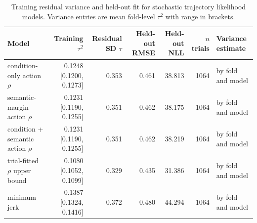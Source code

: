 \begin{table}[htbp]
\centering
\small
\caption{Training residual variance and held-out fit for stochastic trajectory likelihood models. Variance entries are mean fold-level $\tau^2$ with range in brackets.}
\label{tab:stochastic-variance-calibration}
\begin{tabular}{lrrrrrl}
\toprule
Model & Training $\tau^2$ & Residual SD $\tau$ & Held-out RMSE & Held-out NLL & $n$ trials & Variance estimate \\
\midrule
condition-only action $\rho$ & 0.1248 [0.1200, 0.1273] & 0.353 & 0.461 & 38.813 & 1064 & by fold and model \\
semantic-margin action $\rho$ & 0.1231 [0.1190, 0.1255] & 0.351 & 0.462 & 38.175 & 1064 & by fold and model \\
condition + semantic action $\rho$ & 0.1231 [0.1190, 0.1255] & 0.351 & 0.462 & 38.219 & 1064 & by fold and model \\
trial-fitted $\rho$ upper bound & 0.1080 [0.1052, 0.1099] & 0.329 & 0.435 & 31.386 & 1064 & by fold and model \\
minimum jerk & 0.1387 [0.1324, 0.1416] & 0.372 & 0.480 & 44.294 & 1064 & by fold and model \\
\bottomrule
\end{tabular}
\end{table}
